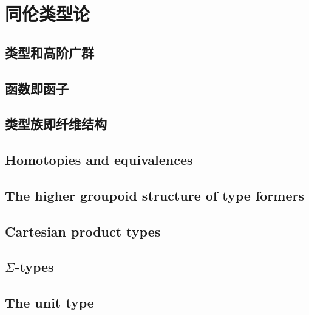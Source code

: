 \chapter{同伦类型论}
\label{cha:basics}


\section{类型和高阶广群}
\label{sec:equality}


\section{函数即函子}
\label{sec:functors}


\section{类型族即纤维结构}
\label{sec:fibrations}


\section{Homotopies and equivalences}
\label{sec:basics-equivalences}


\section{The higher groupoid structure of type formers}
\label{sec:computational}


\section{Cartesian product types}
\label{sec:compute-cartprod}


\section{\texorpdfstring{$\Sigma$}{Σ}-types}
\label{sec:compute-sigma}


\section{The unit type}
\label{sec:compute-unit}


